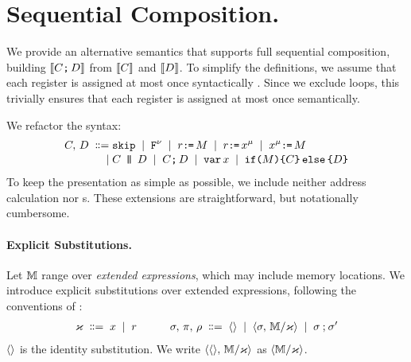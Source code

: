 \section{Sequential Composition.}
We provide an alternative semantics that supports full sequential
composition, building $\llbracket C\texttt{;}\,\allowbreak D\rrbracket$ from $\llbracket C\rrbracket$ and
$\llbracket D\rrbracket$.  To simplify the definitions, we assume that each register is
assigned at most once syntactically
\cite{Rosen:1988:GVN:73560.73562}.  Since we exclude loops, this trivially ensures that each
register is assigned at most once semantically.

We refactor the syntax:
\begin{align*}
  C,\,D
  \;\mathrel{\mathord{\vcentcolon}\mkern-1mu\mathord{\vcentcolon}\mathord{{=}}}\;& \texttt{skip}
  \;\mathrel{|}\; \texttt{F}^{\nu}
  \;\mathrel{|}\; r\texttt{:}\mkern-1mu\texttt{=}\,M
  \;\mathrel{|}\; r\texttt{:}\mkern-1mu\texttt{=}\,x^{\mu} 
  \;\mathrel{|}\; x^{\mu}\texttt{:}\mkern-1mu\texttt{=}\,M
  \\[-.5ex]
  \;\mathrel{|}\;&C \,\mathbin{\texttt{|}\mkern-6mu\texttt{|}}\, D
  \;\mathrel{|}\;C \texttt{;}\,\allowbreak D
  \;\mathrel{|}\; \texttt{var}\,x
  \;\mathrel{|}\; \texttt{if}\allowbreak\texttt{(}M\texttt{)} \allowbreak\texttt{\{} C \texttt{\}}\,\allowbreak\texttt{else}\allowbreak\,\texttt{\{} D \texttt{\}}
\end{align*}
To keep the presentation as simple as possible, we include neither address
calculation nor \RMW{}s.  These extensions are straightforward, but
notationally cumbersome.

\paragraph{Explicit Substitutions.}
Let $\mathbb{M}$ range over \emph{extended expressions}, which may include memory
locations.  We introduce explicit substitutions over extended expressions,
following the conventions of \citet{DBLP:conf/icalp/RitterP97}:
\begin{gather*}
  \aLocReg\BNFDEF \aLoc \BNFSEP \aReg
  \qquad\quad
  \aSub,\,\bSub,\, \SUBDRS{\dEvs} %
  \BNFDEF \SUBEMP \BNFSEP \SUBPAR{\aSub}{\aEExp/\aLocReg}
  \BNFSEP \aSub\SUBSEQ\aSub'
\end{gather*}
$\langle\rangle$ is the identity substitution.  We write
$\langle\langle\rangle,\,\mathbb{M}/\varkappa\rangle$ as $\langle\mathbb{M}/\varkappa\rangle$.

